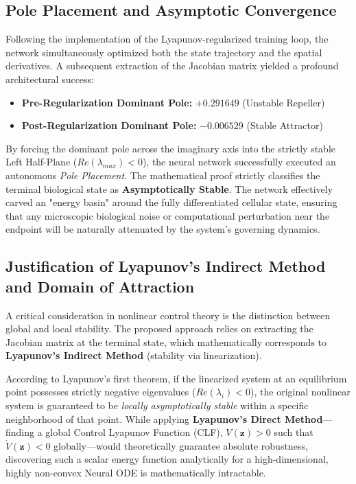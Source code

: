 \documentclass[12pt, a4paper]{article}
\begin{document}
	\subsection{Pole Placement and Asymptotic Convergence}
	Following the implementation of the Lyapunov-regularized training loop, the network simultaneously optimized both the state trajectory and the spatial derivatives. A subsequent extraction of the Jacobian matrix yielded a profound architectural success:
	
	\begin{itemize}
		\item \textbf{Pre-Regularization Dominant Pole:} $+0.291649$ (Unstable Repeller)
		\item \textbf{Post-Regularization Dominant Pole:} $-0.006529$ (Stable Attractor)
	\end{itemize}
	
	By forcing the dominant pole across the imaginary axis into the strictly stable Left Half-Plane ($Re(\lambda_{max}) < 0$), the neural network successfully executed an autonomous \textit{Pole Placement}. The mathematical proof strictly classifies the terminal biological state as \textbf{Asymptotically Stable}. The network effectively carved an "energy basin" around the fully differentiated cellular state, ensuring that any microscopic biological noise or computational perturbation near the endpoint will be naturally attenuated by the system's governing dynamics.
	
	\subsection{Justification of Lyapunov's Indirect Method and Domain of Attraction}
	
	A critical consideration in nonlinear control theory is the distinction between global and local stability. The proposed approach relies on extracting the Jacobian matrix at the terminal state, which mathematically corresponds to \textbf{Lyapunov's Indirect Method} (stability via linearization). 
	
	According to Lyapunov's first theorem, if the linearized system at an equilibrium point possesses strictly negative eigenvalues ($Re(\lambda_i) < 0$), the original nonlinear system is guaranteed to be \textit{locally asymptotically stable} within a specific neighborhood of that point. While applying \textbf{Lyapunov's Direct Method}—finding a global Control Lyapunov Function (CLF), $V(\mathbf{z}) > 0$ such that $\dot{V}(\mathbf{z}) < 0$ globally—would theoretically guarantee absolute robustness, discovering such a scalar energy function analytically for a high-dimensional, highly non-convex Neural ODE is mathematically intractable.
	
\end{document}
